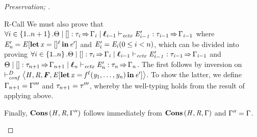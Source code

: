 \begin{proof}[Preservation; ]
\begin{rneqncase}{R-Call}
    We must also prove that $\forall i\in\set{1..n+1}.\Theta  \mid  \HOLE  \ottsym{:}  \tau_{\ottmv{i}}  \produces  \Gamma_{\ottmv{i}}  \mid  \oldvec{\ell}_{{\ottmv{i}-1}}  \vdash_{\mathit{ectx} }  \ottnt{E'_{{\ottmv{i}-1}}}  \ottsym{:}  \tau_{{\ottmv{i}-1}}  \produces  \Gamma_{{\ottmv{i}-1}}$  where $\mathit{E'_{\mathit{n}}}  =  \mathit{E}  [   \operatorname{\mathbf{let}}  \mathit{x}  =   []^ \ell   \operatorname{\mathbf{in}}  \mathit{e'}   ]$ and $\mathit{E'_{\mathit{i}}}  =  \mathit{E_{\mathit{i}}} (0 \leq i < n)$,
    which can be divided into proving
    $\forall i\in\set{1..n}.\Theta  \mid  \HOLE  \ottsym{:}  \tau_{\ottmv{i}}  \produces  \Gamma_{\ottmv{i}}  \mid  \oldvec{\ell}_{{\ottmv{i}-1}}  \vdash_{\mathit{ectx} }  \ottnt{E'_{{\ottmv{i}-1}}}  \ottsym{:}  \tau_{{\ottmv{i}-1}}  \produces  \Gamma_{{\ottmv{i}-1}}$ and $\Theta  \mid  \HOLE  \ottsym{:}   \tau_{n+1}   \produces   \tenv_{n+1}   \mid  \oldvec{\ell}_{\ottmv{n}}  \vdash_{\mathit{ectx} }  \ottnt{E'_{\ottmv{n}}}  \ottsym{:}  \tau_{\ottmv{n}}  \produces  \Gamma_{\ottmv{n}}$. The first follows by inversion on $ \vdash_{\mathit{conf} }^D   \tuple{ \ottnt{H} ,  \ottnt{R} ,  \oldvec{F} ,  \ottnt{E}  \ottsym{[}   \LET  \mathit{x}  =   \mathit{f} ^ \ell (  \mathit{y_{{\mathrm{1}}}} ,\ldots, \mathit{y_{\ottmv{n}}}  )   \IN  \ottnt{e'}   \ottsym{]} }  $.
    To show the latter, we define $ \Gamma_{n+1}   =  \Gamma'''$ and $ \tau_{n+1}   =  \tau'''$, whereby the
    well-typing holds from the result of applying  above.
    
    Finally, $\mathbf{Cons} \, (  \mathit{H}  ,  \mathit{R}  ,  \Gamma''  )$ follows immediately from $\mathbf{Cons} \, (  \mathit{H}  ,  \mathit{R}  ,  \Gamma  )$ and $\Gamma''  =  \Gamma$.
  \end{rneqncase}
\end{proof}

